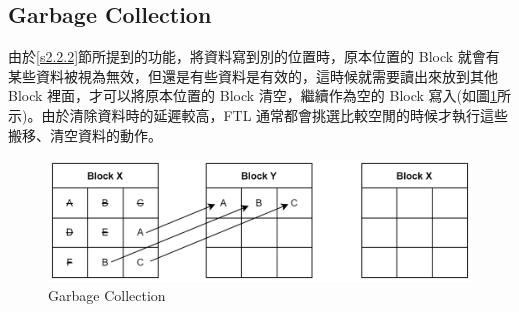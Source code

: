 \subsection{Garbage Collection}\label{s2.2.3}
\indent
由於\ref{s2.2.2}節所提到的功能，將資料寫到別的位置時，原本位置的 Block 就會有某些資料被視為無效，但還是有些資料是有效的，這時候就需要讀出來放到其他 Block 裡面，才可以將原本位置的 Block 清空，繼續作為空的 Block 寫入(如圖\ref{f2.7}所示)。由於清除資料時的延遲較高，FTL 通常都會挑選比較空閒的時候才執行這些搬移、清空資料的動作。\cite{BUX20101172}
\begin{figure}[H]
    \centering
    \includegraphics[width=1\textwidth]{picture/ch2/garbage_collection.png}
    \caption{Garbage Collection\cite{Garbage_Collection}}
    \label{f2.7}
\end{figure}


